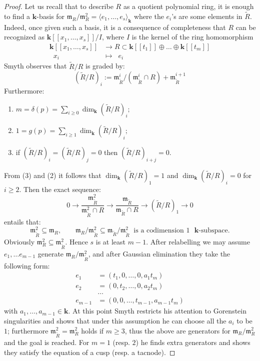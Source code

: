 \documentclass[11pt]{amsart}
\renewcommand{\k}{\mathbf k}
\renewcommand{\to}{\rightarrow}
\theoremstyle{plain}
\theoremstyle{definition}
\begin{document}
\begin{proof}
Let us recall that to describe $R$ as a quotient polynomial ring, it is enough to find a $\k$-basis for $\mathfrak{m}_R/\mathfrak{m}^2_R=\langle e_1,\ldots, e_s\rangle_{\k}$ where the $e_i$'s are some elements in $\widetilde{R}.$ Indeed, once given such a basis, it is a consequence of completeness that $R$ can be recognized as $\k[[x_1,\ldots, x_s]]/I$, where $I$ is the kernel of the ring homomorphism
\begin{align*}\label{eq:singularity}
\k[[x_1,\ldots, x_s]]&\rightarrow R\subset \k[[t_1]]\oplus\ldots\oplus \k[[t_m]]\\
\;\;x_i\;\; &\mapsto \;\; e_i\;\;
\end{align*}
Smyth observes that $\widetilde R/R$ is graded by:
\[ (\widetilde R/R)_i:=\mathfrak m_{\widetilde R}^i/(\mathfrak m_{\widetilde R}^i\cap R)+\mathfrak m_{\widetilde R}^{i+1}\]
Furthermore:
\begin{enumerate}
\item $m=\delta(p)=\sum_{i\geq 0}\dim_\k(\widetilde R/R)_i;$
\item $1=g(p)=\sum_{i\geq 1}\dim_\k(\widetilde R/R)_i;$
\item if $(\widetilde R/R)_i=(\widetilde R/R)_j=0$ then $(\widetilde R/R)_{i+j}=0$.
\end{enumerate}
From (3) and (2) it follows that $\dim_\k(\widetilde R/R)_1=1$ and $\dim_\k(\widetilde R/R)_i=0$ for $i\geq 2$. Then the exact sequence:
\[ 0\to \frac{\mathfrak m_{\widetilde R}^2}{\mathfrak m_{\widetilde R}^2\cap R}\to\frac{\mathfrak m_{\widetilde R}}{\mathfrak m_{\widetilde R}\cap R}\to (\widetilde R/R)_1\to 0\]
entails that:
\[\mathfrak{m}^2_{\widetilde{R}}\subseteq \mathfrak m_R,\qquad \mathfrak{m}_R/\mathfrak{m}^2_{\widetilde{R}}\subseteq \mathfrak{m}_{\widetilde{R}}/\mathfrak{m}^2_{\widetilde{R}}\;\;\text{is a codimension $1$ $\k$-subspace}.\]
Obviously $\mathfrak{m}^2_{R}\subseteq\mathfrak{m}^2_{\widetilde{R}}$. Hence $s$ is at least $m-1$. After relabelling we may assume $e_1,\dots e_{m-1}$ generate $\mathfrak{m}_R/\mathfrak{m}^2_{\widetilde{R}}$, and after Gaussian elimination they take the following form:
\begin{align*}
e_1&= (t_1, 0, \ldots, 0, a_1 t_m) \\
e_2&= (0, t_2, \ldots, 0, a_2 t_m) \\
 & \ldots \\
e_{m-1} &= (0, 0,\ldots, t_{m-1}, a_{m-1}t_m)
\end{align*}
with $a_{1}, \ldots, a_{m-1}\in \k.$ At this point Smyth restricts his attention to Gorenstein singularities and shows that under this assumption he can choose all the $a_i$ to be $1$; furthermore $\mathfrak{m}^2_{\widetilde{R}}=\mathfrak{m}^2_{R}$ holds if $m\geq 3$, thus the above are generators for $\mathfrak{m}_R/\mathfrak{m}^2_R$ and the goal is reached. For $m=1$ (resp. $2$) he finds extra generators and shows they satisfy the equation of a cusp (resp. a tacnode).


\end{proof}
\end{document}
